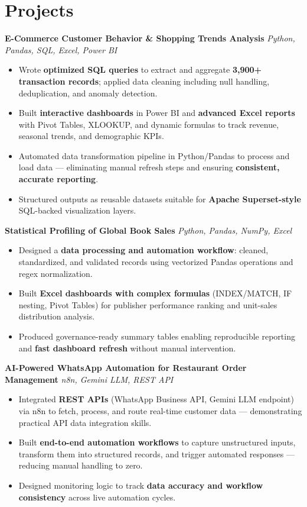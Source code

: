 \documentclass[10.5pt,a4paper]{article}
\newcommand{\roleline}[2]{%
  \textbf{#1} \hfill {\small\itshape\color{gray}#2}%
}
\begin{document}
\section{Projects}

\roleline{E-Commerce Customer Behavior \& Shopping Trends Analysis}{Python, Pandas, SQL, Excel, Power BI}
\begin{itemize}
  \item Wrote \textbf{optimized SQL queries} to extract and aggregate \textbf{3,900+ transaction records}; applied data cleaning including null handling, deduplication, and anomaly detection.
  \item Built \textbf{interactive dashboards} in Power BI and \textbf{advanced Excel reports} with Pivot Tables, XLOOKUP, and dynamic formulas to track revenue, seasonal trends, and demographic KPIs.
  \item Automated data transformation pipeline in Python/Pandas to process and load data --- eliminating manual refresh steps and ensuring \textbf{consistent, accurate reporting}.
  \item Structured outputs as reusable datasets suitable for \textbf{Apache Superset-style} SQL-backed visualization layers.
\end{itemize}

\vspace{3pt}
\roleline{Statistical Profiling of Global Book Sales}{Python, Pandas, NumPy, Excel}
\begin{itemize}
  \item Designed a \textbf{data processing and automation workflow}: cleaned, standardized, and validated records using vectorized Pandas operations and regex normalization.
  \item Built \textbf{Excel dashboards with complex formulas} (INDEX/MATCH, IF nesting, Pivot Tables) for publisher performance ranking and unit-sales distribution analysis.
  \item Produced governance-ready summary tables enabling reproducible reporting and \textbf{fast dashboard refresh} without manual intervention.
\end{itemize}

\vspace{3pt}
\roleline{AI-Powered WhatsApp Automation for Restaurant Order Management}{n8n, Gemini LLM, REST API}
\begin{itemize}
  \item Integrated \textbf{REST APIs} (WhatsApp Business API, Gemini LLM endpoint) via n8n to fetch, process, and route real-time customer data --- demonstrating practical API data integration skills.
  \item Built \textbf{end-to-end automation workflows} to capture unstructured inputs, transform them into structured records, and trigger automated responses --- reducing manual handling to zero.
  \item Designed monitoring logic to track \textbf{data accuracy and workflow consistency} across live automation cycles.
\end{itemize}
\end{document}
